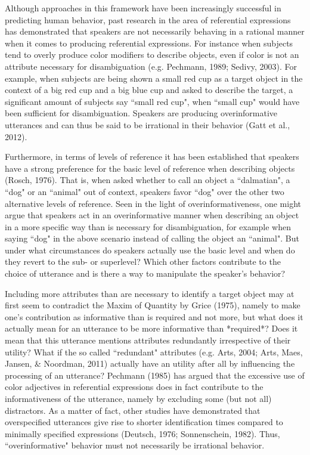 \documentclass[10pt,letterpaper]{article}
\begin{document}
Although approaches in this framework have been increasingly successful in predicting human behavior, past research in the area of referential expressions has demonstrated that speakers are not necessarily behaving in a rational manner when it comes to producing referential expressions. For instance when subjects tend to overly produce color modifiers to describe objects, even if color is not an attribute necessary for disambiguation (e.g. Pechmann, 1989; Sedivy, 2003). For example, when subjects are being shown a small red cup as a target object in the context of a big red cup and a big blue cup and asked to describe the target, a significant amount of subjects say “small red cup", when “small cup" would have been sufficient for disambiguation. Speakers are producing overinformative utterances and can thus be said to be irrational in their behavior (Gatt et al., 2012). 

Furthermore, in terms of levels of reference it has been established that speakers have a strong preference for the basic level of reference when describing objects (Rosch, 1976). That is, when asked whether to call an object a “dalmatian", a “dog" or an “animal" out of context, speakers favor “dog" over the other two alternative levels of reference. Seen in the light of overinformativeness, one might argue that speakers act in an overinformative manner when describing an object in a more specific way than is necessary for disambiguation, for example when saying “dog" in the above scenario instead of calling the object an “animal". But under what circumstances do speakers actually use the basic level and when do they revert to the sub- or superlevel? Which other factors contribute to the choice of utterance and is there a way to manipulate the speaker's behavior? 

Including more attributes than are necessary to identify a target object may at first seem to contradict the Maxim of Quantity by Grice (1975), namely to make one's contribution as informative than is required and not more, but what does it actually mean for an utterance to be more informative than *required*? Does it mean that this utterance mentions attributes redundantly irrespective of their utility? What if the so called “redundant" attributes (e.g. Arts, 2004; Arts, Maes, Jansen, & Noordman, 2011) actually have an utility after all by influencing the processing of an utterance? Pechmann (1985) has argued that the excessive use of color adjectives in referential expressions does in fact contribute to the informativeness of the utterance, namely by excluding some (but not all) distractors. As a matter of fact, other studies have demonstrated that overspecified utterances give rise to shorter identification times compared to minimally specified expressions (Deutsch, 1976; Sonnenschein, 1982). Thus, “overinformative" behavior must not necessarily be irrational behavior. 
\end{document}
